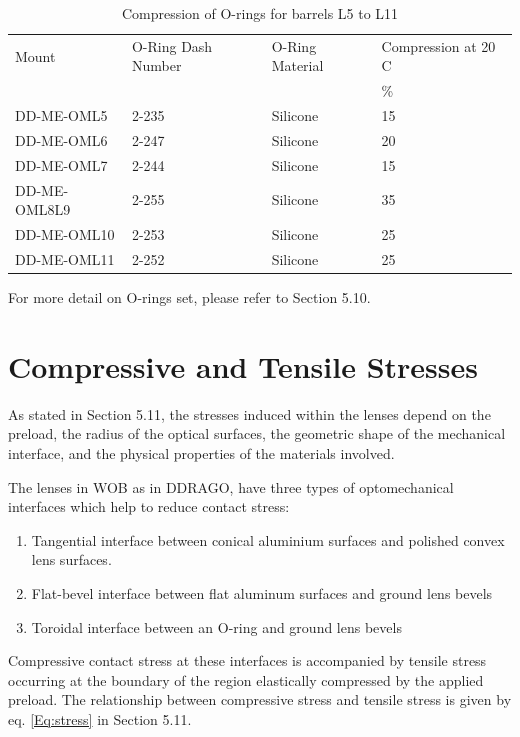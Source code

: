 \documentclass{report}
\begin{document}
\begin{table}
\caption{Compression of O-rings for barrels L5 to L11}
\label{table:compressL5L11}
\begin{center}
\small
\begin{tabular}{llll}
\hline
\hline
Mount	&	O-Ring Dash Number	&	O-Ring Material	&	Compression at 20 C\\ & & & \%	\\
\hline
DD-ME-OML5	&	2-235	&	Silicone	&	15	\\
DD-ME-OML6	&	2-247	&	Silicone	&	20	\\
DD-ME-OML7	&	2-244	&	Silicone	&	15	\\
DD-ME-OML8L9	&	2-255	&	Silicone	&	35	\\
DD-ME-OML10	&	2-253	&	Silicone	&	25	\\
DD-ME-OML11	&	2-252	&	Silicone	&	25	\\
\hline
\end{tabular}
\end{center}
\end{table}

For more detail on O-rings set, please refer to Section 5.10.

\section{Compressive and Tensile Stresses}

As stated in Section 5.11, the stresses induced within the lenses depend on the preload, the radius of the optical surfaces, the geometric shape of the mechanical interface, and the physical properties of the materials involved.

The lenses in WOB as in DDRAGO, have three types of optomechanical interfaces which help to reduce contact stress:
\begin{enumerate}
\item Tangential interface between conical aluminium surfaces and polished convex lens surfaces. 
\item Flat-bevel interface between flat aluminum surfaces and ground lens bevels 
\item Toroidal interface between an O-ring and ground lens bevels 
\end{enumerate}

Compressive contact stress at these interfaces is accompanied by tensile stress occurring at the boundary of the region elastically compressed by the applied preload. The relationship between compressive stress and tensile stress is given by eq. \eqref{Eq:stress} in Section 5.11.
\end{document}
